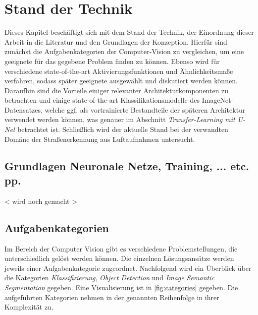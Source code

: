 
\chapter{Stand der Technik}

Dieses Kapitel beschäftigt sich mit dem Stand der Technik, der Einordnung dieser Arbeit in die Literatur 
und den Grundlagen der Konzeption. Hierfür sind zunächst 
die Aufgabenkategorien der Computer-Vision zu vergleichen, um eine geeignete für das gegebene Problem finden zu können.
Ebenso wird für verschiedene state-of-the-art Aktivierungsfunktionen und Ähnlichkeitsmaße verfahren, 
sodass später geeignete ausgewählt und diskutiert werden können. Daraufhin sind 
die Vorteile einiger relevanter Architekturkomponenten zu betrachten und einige 
state-of-the-art Klassifikationsmodelle des ImageNet-Datensatzes, welche ggf. 
als vortrainierte Bestandteile der späteren Architektur verwendet werden können, 
was genauer im Abschnitt \textit{Transfer-Learning mit U-Net} betrachtet ist. 
Schließlich wird der aktuelle Stand bei der verwandten Domäne der Straßenerkennung 
aus Luftaufnahmen untersucht.

\section{Grundlagen Neuronale Netze, Training, ... etc. pp.}

< wird noch gemacht > 

\section{Aufgabenkategorien} \label{sec:aufgabenkategorien}
Im Bereich der Computer Vision gibt es verschiedene Problemstellungen, die unterschiedlich gelöst werden können.
Die einzelnen Lösungsansätze werden jeweils einer Aufgabenkategorie zugeordnet.
Nachfolgend wird ein Überblick über die Kategorien \textit{Klassifizierung}, \textit{Object Detection} und \textit{Image Semantic Segmentation} gegeben.
Eine Visualisierung ist in \autoref{fig:categories} gegeben.
Die aufgeführten Kategorien nehmen in der genannten Reihenfolge in ihrer Komplexität zu.

